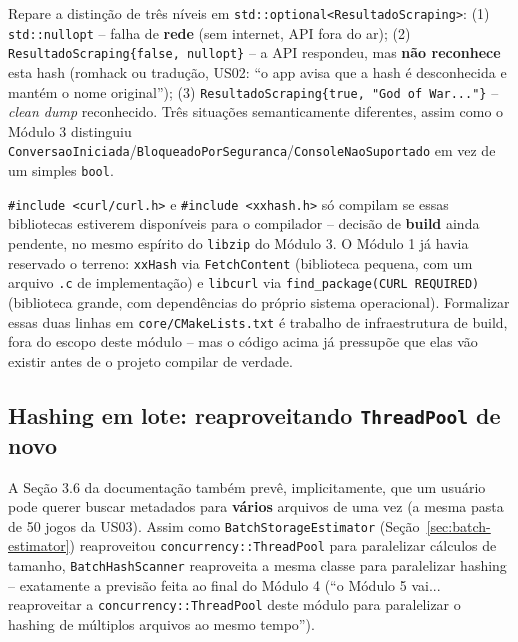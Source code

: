 \begin{CaixaInfo}
Repare a distinção de três níveis em \texttt{std::optional<ResultadoScraping>}: (1) \texttt{std::nullopt} -- falha de \textbf{rede} (sem internet, API fora do ar); (2) \texttt{ResultadoScraping\{false, nullopt\}} -- a API respondeu, mas \textbf{não reconhece} esta hash (romhack ou tradução, US02: ``o app avisa que a hash é desconhecida e mantém o nome original''); (3) \texttt{ResultadoScraping\{true, "God of War..."\}} -- \textit{clean dump} reconhecido. Três situações semanticamente diferentes, assim como o Módulo 3 distinguiu \texttt{ConversaoIniciada}/\texttt{BloqueadoPorSeguranca}/\texttt{ConsoleNaoSuportado} em vez de um simples \texttt{bool}.
\end{CaixaInfo}

\begin{CaixaAlerta}
\texttt{\#include <curl/curl.h>} e \texttt{\#include <xxhash.h>} só compilam se essas bibliotecas estiverem disponíveis para o compilador -- decisão de \textbf{build} ainda pendente, no mesmo espírito do \texttt{libzip} do Módulo 3. O Módulo 1 já havia reservado o terreno: \texttt{xxHash} via \texttt{FetchContent} (biblioteca pequena, com um arquivo \texttt{.c} de implementação) e \texttt{libcurl} via \texttt{find\_package(CURL REQUIRED)} (biblioteca grande, com dependências do próprio sistema operacional). Formalizar essas duas linhas em \texttt{core/CMakeLists.txt} é trabalho de infraestrutura de build, fora do escopo deste módulo -- mas o código acima já pressupõe que elas vão existir antes de o projeto compilar de verdade.
\end{CaixaAlerta}

\subsection{Hashing em lote: reaproveitando \texttt{ThreadPool} de novo}
\label{sec:batch-hash}

A Seção 3.6 da documentação também prevê, implicitamente, que um usuário pode querer buscar metadados para \textbf{vários} arquivos de uma vez (a mesma pasta de 50 jogos da US03). Assim como \texttt{BatchStorageEstimator} (Seção~\ref{sec:batch-estimator}) reaproveitou \texttt{concurrency::ThreadPool} para paralelizar cálculos de tamanho, \texttt{BatchHashScanner} reaproveita a mesma classe para paralelizar hashing -- exatamente a previsão feita ao final do Módulo 4 (``o Módulo 5 vai... reaproveitar a \texttt{concurrency::ThreadPool} deste módulo para paralelizar o hashing de múltiplos arquivos ao mesmo tempo'').

